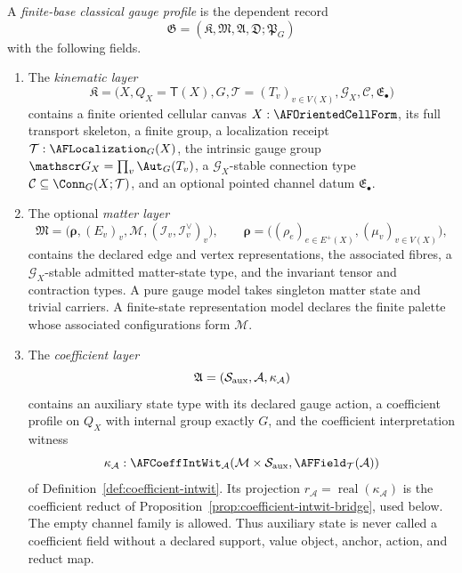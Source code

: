 \begin{definition}
\label{def:gauge-profile}
A \emph{finite-base classical gauge profile} is the dependent record
\[
 \mathfrak G=(\mathfrak K,\mathfrak M,\mathfrak A,\mathfrak D;
                    \mathfrak P_G)
\]
with the following fields.
\begin{enumerate}[label=\textup{(\roman*)},leftmargin=2.5em]
\item The \emph{kinematic layer}
\[
 \mathfrak K=\bigl(X,Q_X=\mathsf T(X),G,
          \mathcal T=(T_v)_{v\in V(X)},
          \mathscr G_X,\mathcal C,\mathfrak E_{\bullet}\bigr)
\]
contains a finite oriented cellular canvas $X:\AFOrientedCellForm$, its full
transport skeleton, a finite group, a localization receipt
$\mathcal T:\AFLocalization_G(X)$, the intrinsic gauge group
$\mathscr G_X=\prod_v\Aut_G(T_v)$, a $\mathscr G_X$-stable connection type
$\mathcal C\subseteq\Conn_G(X;\mathcal T)$, and an optional pointed channel
datum $\mathfrak E_{\bullet}$.

\item The optional \emph{matter layer}
\[
 \mathfrak M=
 \bigl(\boldsymbol\rho,(E_v)_v,\mathcal M,
              (\mathcal I_v,\mathcal I_v^{\vee})_v\bigr),
 \qquad
 \boldsymbol\rho=
 \bigl((\rho_e)_{e\in E^+(X)},(\mu_v)_{v\in V(X)}\bigr),
\]
contains the declared edge and vertex representations, the associated fibres,
a $\mathscr G_X$-stable admitted matter-state type, and the invariant tensor
and contraction types.  A pure gauge model takes singleton matter state and
trivial carriers.  A finite-state representation model declares the finite
palette whose associated configurations form $\mathcal M$.

\item The \emph{coefficient layer}
\[
 \mathfrak A=(\mathcal S_{\rm aux},\mathcal A,\kappa_{\mathcal A})
\]
contains an auxiliary state type with its declared gauge action, a coefficient
profile on $Q_X$ with internal group exactly $G$, and
the coefficient interpretation witness
\[
 \kappa_{\mathcal A}:
 \AFCoeffIntWit_{\mathcal A}
  (\mathcal M\times\mathcal S_{\rm aux},
   \AFField_{\mathcal T}(\mathcal A))
\]
of Definition~\ref{def:coefficient-intwit}.  Its projection
$r_{\mathcal A}=\operatorname{real}(\kappa_{\mathcal A})$ is the coefficient
reduct of Proposition~\ref{prop:coefficient-intwit-bridge}, used below.  The
empty channel family is allowed.
Thus auxiliary state is never called a coefficient field without a declared
support, value object, anchor, action, and reduct map.


\end{enumerate}
\end{definition}
